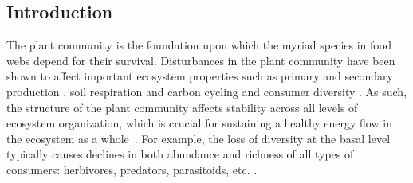 \documentclass[12pt]{article}
\begin{document}
\begin{spacing}{2.0}

\clearpage
\section*{Introduction} %

     The plant community is the foundation upon which the myriad species in food webs depend for their survival.
     Disturbances in the plant community have been shown to affect important ecosystem properties such as primary \citep{Hector1999} and secondary production \citep{borer2012plant}, soil respiration and carbon cycling \citep{chen2019plant} and consumer diversity \citep{scherber2010bottom, Baiser2016}.
     As such, the structure of the plant community affects stability across all levels of ecosystem organization, which is crucial for sustaining a healthy energy flow in the ecosystem as a whole~\citep{proulx2010diversity, scherber2010bottom, Rosenblatt2016}. 
     For example, the loss of diversity at the basal level typically causes declines in both abundance and richness of all types of consumers: herbivores, predators, parasitoids, etc. \citep{scherber2010bottom}.



\end{spacing}
\end{document}
